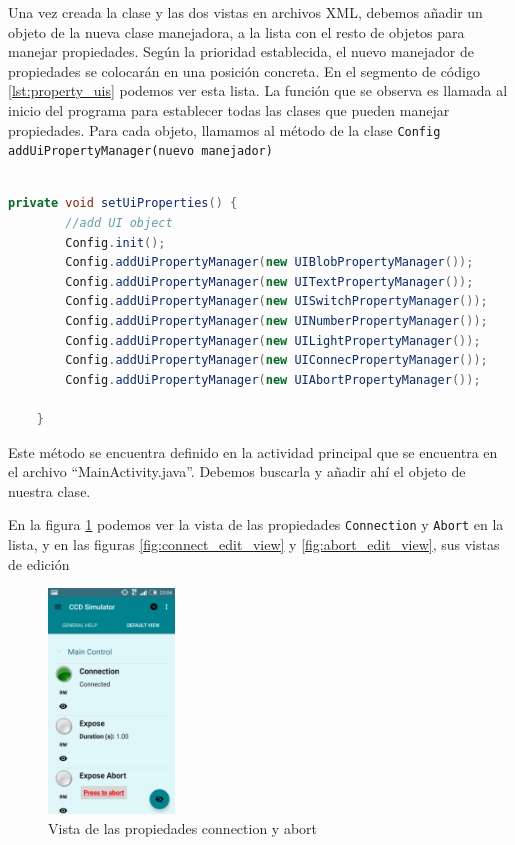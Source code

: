 \bigskip
Una vez creada la clase y las dos vistas en archivos XML, debemos añadir un objeto de la nueva clase manejadora, a la lista con el resto de objetos para manejar propiedades. Según la prioridad establecida, el nuevo manejador de propiedades se colocarán en una posición concreta. En el segmento de código \ref{lst:property_uis} podemos ver esta lista. La función que se observa es llamada al inicio del programa para establecer todas las clases que pueden manejar propiedades. Para cada objeto, llamamos al método de la clase \texttt{Config} \texttt{addUiPropertyManager(nuevo manejador)}

\begin{lstlisting}[language=Java,caption={Lista de objetos manejadores de propiedades},label={lst:property_uis}]

private void setUiProperties() {
        //add UI object
        Config.init();
        Config.addUiPropertyManager(new UIBlobPropertyManager());
        Config.addUiPropertyManager(new UITextPropertyManager());
        Config.addUiPropertyManager(new UISwitchPropertyManager());
        Config.addUiPropertyManager(new UINumberPropertyManager());
        Config.addUiPropertyManager(new UILightPropertyManager());
        Config.addUiPropertyManager(new UIConnecPropertyManager());
        Config.addUiPropertyManager(new UIAbortPropertyManager());

    }

\end{lstlisting}

Este método se encuentra definido en la actividad principal que se encuentra en el archivo ``MainActivity.java''. Debemos buscarla y añadir ahí el objeto de nuestra clase.

\bigskip
En la figura \ref{fig:connect_abort} podemos ver la vista de las propiedades \texttt{Connection} y \texttt{Abort} en la lista, y en las figuras \ref{fig:connect_edit_view} y \ref{fig:abort_edit_view}, sus vistas de edición

\begin{figure}[!ht]
  \begin{center}
  \includegraphics[width=0.3\textwidth]{../images/captura10.png}
  \caption{Vista de las propiedades connection y abort}
  \label{fig:connect_abort}
  \end{center}
\end{figure}

